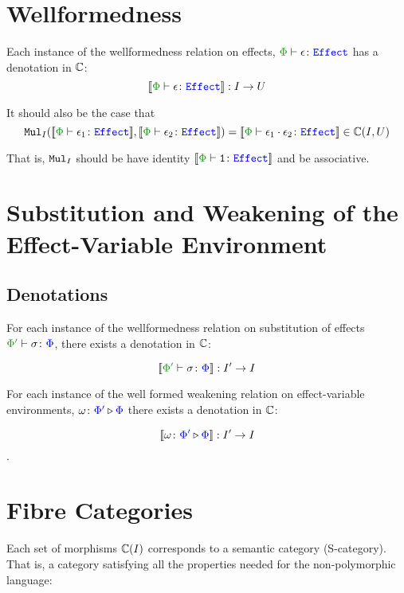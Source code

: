 \documentclass{report}
\begin{document}
\section{Wellformedness}

Each instance of the wellformedness relation on effects, $\wellformede{\P}{\e}$ has a denotation in $\mathbb{C}$: \begin{equation}
    \deno{\typerelation{\P}{\e}{\effect}}: I \rightarrow U
\end{equation}

It should also be the case that \begin{equation}
    \Mul_I(\deno{\typerelation{\P}{\e_1}{\effect}}, \deno{\typerelation{\P}{\e_2}{\effect}}) = \deno{\typerelation{\P}{\e_1\dot\e_2}{\effect}} \in \ciu
\end{equation}

That is, $\texttt{Mul}_I$ should be have identity $\deno{\typerelation{\P}{\1}{\effect}}$ and be associative.


\section{Substitution and Weakening of the Effect-Variable Environment}


\subsection{Denotations}


For each instance of the wellformedness relation on substitution of effects $\typerelation{\P'}{\si}{\P}$, there exists a denotation in $\mathbb{C}$:

\begin{equation}
    \deno{\typerelation{\P'}{\si}{\P}}: I'\rightarrow I
\end{equation}

For each instance of the well formed weakening relation on effect-variable environments, $\omega \colon {\color{blue}\Phi'} \triangleright {\color {blue} \Phi}$
 there exists a denotation in $\mathbb{C}$:

\begin{equation}
     {\bf [\![}\omega \colon {\color{blue}\Phi'} \triangleright {\color {blue} \Phi}{\bf ]\!]}: I'\rightarrow I
\end{equation}.

\section{Fibre Categories}
Each set of morphisms $\mathbb{C}(I)$ corresponds to a semantic category (S-category). That is, a category satisfying all the properties needed for the non-polymorphic language:
\end{document}
